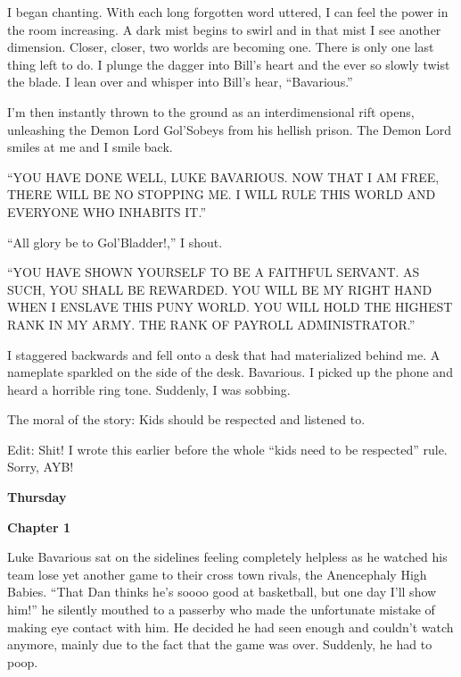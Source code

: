 I began chanting. With each long forgotten word uttered, I can feel
the power in the room increasing. A dark mist begins to swirl and
in that mist I see another dimension. Closer, closer, two worlds
are becoming one. There is only one last thing left to do. I plunge
the dagger into Bill's heart and the ever so slowly twist the
blade. I lean over and whisper into Bill's hear, ``Bavarious.''



I'm then instantly thrown to the ground as an interdimensional rift
opens, unleashing the Demon Lord Gol'Sobeys from his hellish
prison. The Demon Lord smiles at me and I smile back.



``YOU HAVE DONE WELL, LUKE BAVARIOUS. NOW THAT I AM FREE, THERE WILL
BE NO STOPPING ME. I WILL RULE THIS WORLD AND EVERYONE WHO INHABITS
IT.''



``All glory be to Gol'Bladder!,'' I shout.



``YOU HAVE SHOWN YOURSELF TO BE A FAITHFUL SERVANT. AS SUCH, YOU
SHALL BE REWARDED. YOU WILL BE MY RIGHT HAND WHEN I ENSLAVE THIS
PUNY WORLD. YOU WILL HOLD THE HIGHEST RANK IN MY ARMY. THE RANK OF
PAYROLL ADMINISTRATOR.''



I staggered backwards and fell onto a desk that had materialized
behind me. A nameplate sparkled on the side of the desk. Bavarious.
I picked up the phone and heard a horrible ring tone. Suddenly, I
was sobbing.



The moral of the story: Kids should be respected and listened
to.



Edit: Shit! I wrote this earlier before the whole ``kids need to be
respected'' rule. Sorry, AYB! 
 





{\bf Thursday}



{\bf Chapter 1}

Luke Bavarious sat on the sidelines feeling completely helpless as
he watched his team lose yet another game to their cross town
rivals, the Anencephaly High Babies. ``That Dan thinks he's soooo
good at basketball, but one day I'll show him!'' he silently
mouthed to a passerby who made the unfortunate mistake of making
eye contact with him. He decided he had seen enough and couldn't
watch anymore, mainly due to the fact that the game was over.
Suddenly, he had to poop.



